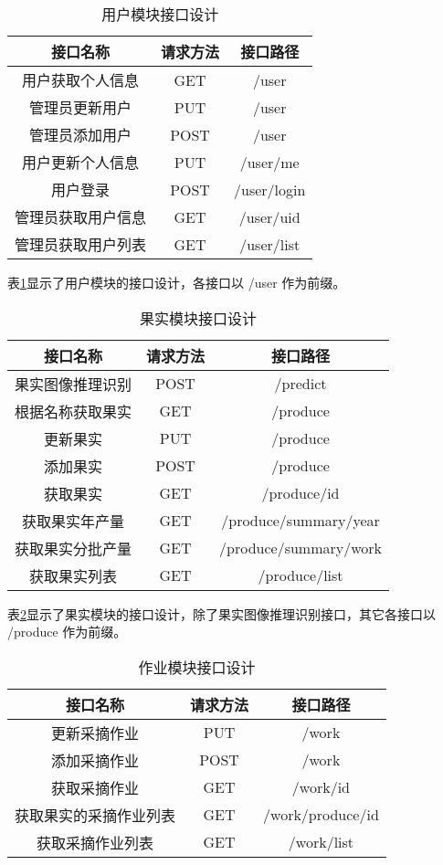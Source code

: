 \begin{table}[H]
\centering
\caption{用户模块接口设计}
\label{tab:interface-user}
\begin{tabular}{|c|c|c|}
\hline
接口名称 & 请求方法 & 接口路径 \\ \hline
用户获取个人信息 & GET & /user \\ \hline
管理员更新用户 & PUT & /user \\ \hline
管理员添加用户 & POST & /user \\ \hline
用户更新个人信息 & PUT & /user/me \\ \hline
用户登录 & POST & /user/login \\ \hline
管理员获取用户信息 & GET & /user/{uid} \\ \hline
管理员获取用户列表 & GET & /user/list \\ \hline
\end{tabular}
\end{table}

表\ref{tab:interface-user}显示了用户模块的接口设计，各接口以 /user 作为前缀。

\begin{table}[H]
\centering
\caption{果实模块接口设计}
\label{tab:interface-produce}
\begin{tabular}{|c|c|c|}
\hline
接口名称 & 请求方法 & 接口路径 \\ \hline
果实图像推理识别 & POST & /predict \\ \hline
根据名称获取果实 & GET & /produce \\ \hline
更新果实 & PUT & /produce \\ \hline
添加果实 & POST & /produce \\ \hline
获取果实 & GET & /produce/{id} \\ \hline
获取果实年产量 & GET & /produce/summary/year \\ \hline
获取果实分批产量 & GET & /produce/summary/work \\ \hline
获取果实列表 & GET & /produce/list \\ \hline
\end{tabular}
\end{table}

表\ref{tab:interface-produce}显示了果实模块的接口设计，除了果实图像推理识别接口，其它各接口以 /produce 作为前缀。

\begin{table}[H]
\centering
\caption{作业模块接口设计}
\label{tab:interface-work}
\begin{tabular}{|c|c|c|}
\hline
接口名称 & 请求方法 & 接口路径 \\ \hline
更新采摘作业 & PUT & /work \\ \hline
添加采摘作业 & POST & /work \\ \hline
获取采摘作业 & GET & /work/{id} \\ \hline
获取果实的采摘作业列表 & GET & /work/produce/{id}\\ \hline
获取采摘作业列表 & GET & /work/list \\ \hline
\end{tabular}
\end{table}

